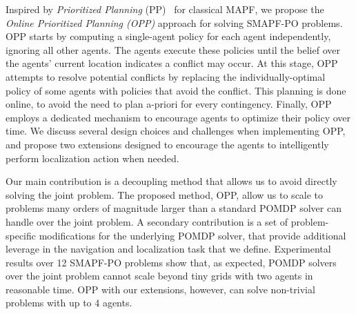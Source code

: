 \documentclass[letterpaper]{article} %
\begin{document}
Inspired by \emph{Prioritized Planning} (PP)~\cite{silver2005cooperative} for classical MAPF,
we propose the \emph{Online Prioritized Planning (OPP)} approach for solving SMAPF-PO problems.
OPP starts by computing a single-agent policy for each agent independently, ignoring all other agents.
The agents execute these policies until the belief over the agents' current location indicates a conflict may occur. %
At this stage, OPP attempts to resolve potential conflicts by replacing the individually-optimal policy of some agents with policies that avoid the conflict. This planning is done online, to avoid the need to plan a-priori for every contingency. Finally, OPP employs a dedicated mechanism to encourage agents to optimize their policy over time.
We discuss several design choices and challenges when implementing OPP, and propose two extensions designed to encourage the agents to intelligently perform localization action when needed.

Our main contribution is a decoupling method that allows us to avoid directly solving the joint problem. The proposed method, OPP, allow us to scale to problems many orders of magnitude larger than a standard POMDP solver can handle over the joint problem. A secondary contribution is a set of problem-specific modifications for the underlying POMDP solver, that provide additional leverage in the navigation and localization task that we define.
Experimental results over 12 SMAPF-PO problems show that, as expected, POMDP solvers over the joint problem cannot scale beyond tiny grids with two agents in reasonable time. OPP with our extensions, however, can solve non-trivial problems with up to 4 agents.%
\end{document}
